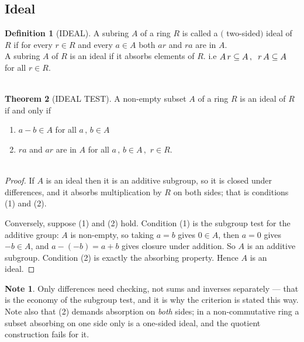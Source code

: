 \documentclass[11pt,a4paper]{article}
\theoremstyle{definition}
\newtheorem{thm}{Theorem}[subsection]
\newtheorem{defn}[thm]{Definition}
\newtheorem*{note}{Note}
\begin{document}
\subsection{Ideal}
\begin{defn}[IDEAL]
A subring $A$ of a ring $R$ is called a $($ two-sided$)$ ideal of $R$ if for every $r\in R$ and every $a\in A$ both $ar$ and $ra$ are in $A$.\\

A subring $A$ of $R$ is an ideal if it absorbs elements of $R$. i.e $A\, r\subseteq A\, , \hspace{0.2cm} r\, A \subseteq A\,$ for all $r\in R$.\\\\
\end{defn}




\begin{thm}[IDEAL TEST]
A non-empty subset $A$ of a ring $R$ is an ideal of $R$ if and only if
\begin{enumerate}
\item $a - b\in A$ for all $a\, ,\, b \in A$
\item $ra$ and $ar$ are in $A$ for all $a\, , \, b\in A\, , \,\, r\in R$.\\\\
\end{enumerate}
\end{thm}

\begin{proof}
If $A$ is an ideal then it is an additive subgroup, so it is closed under
differences, and it absorbs multiplication by $R$ on both sides; that is
conditions (1) and (2).

Conversely, suppose (1) and (2) hold. Condition (1) is the subgroup test for the
additive group: $A$ is non-empty, so taking $a=b$ gives $0\in A$, then $a=0$
gives $-b\in A$, and $a-(-b) = a+b$ gives closure under addition. So $A$ is an
additive subgroup. Condition (2) is exactly the absorbing property. Hence $A$ is
an ideal.
\end{proof}

\begin{note}
Only differences need checking, not sums and inverses separately --- that is the
economy of the subgroup test, and it is why the criterion is stated this way.
Note also that (2) demands absorption on \emph{both} sides; in a
non-commutative ring a subset absorbing on one side only is a one-sided ideal,
and the quotient construction fails for it.
\end{note}
\end{document}
